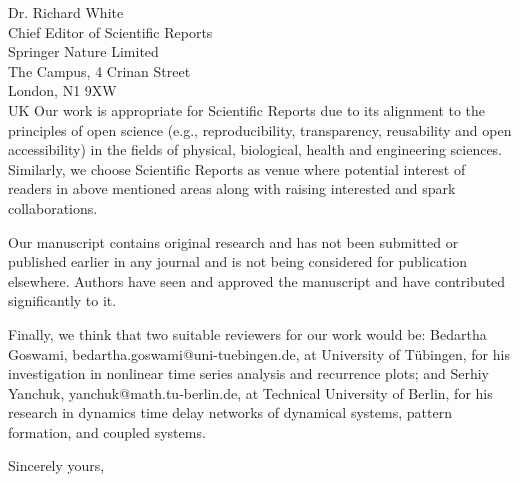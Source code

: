 \documentclass[10pt]{letter}
\begin{document}
\begin{letter}{Dr. Richard White \\
Chief Editor of Scientific Reports \\
Springer Nature Limited \\
The Campus, 4 Crinan Street\\
London, N1 9XW \\
UK
}
Our work is appropriate for Scientific Reports due to its alignment to the principles of open science (e.g., reproducibility, transparency, reusability and open accessibility) in the fields of physical, biological, health and engineering sciences.
Similarly, we choose Scientific Reports as venue where potential interest of readers in above mentioned areas along with raising interested and spark collaborations.

Our manuscript contains original research and has not been submitted or published earlier in any journal and is not being considered for publication elsewhere.   
Authors have seen and approved the manuscript and have contributed significantly to it.

Finally, we think that two suitable reviewers for our work would be: 
Bedartha Goswami, bedartha.goswami@uni-tuebingen.de, at University of Tübingen, for his investigation in nonlinear time series analysis and recurrence plots; 
and Serhiy Yanchuk, yanchuk@math.tu-berlin.de, at Technical University of Berlin, for his research in dynamics time delay networks of dynamical systems, pattern formation, and coupled systems.  

\closing{Sincerely yours,}


\end{letter}
\end{document}
